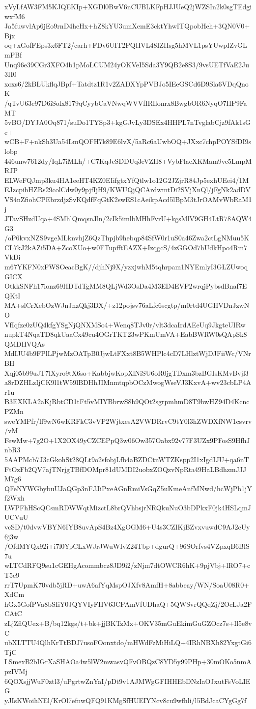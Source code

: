 xVyLfAW3FM5KJQEKIp+XGDl0BwV6nCUBLKFpHJJUeQ2jWZSIn2k0sgTEdgiwxfM6
Ja5fuwvlAp6jEo9rnD4heHx+hZ8kYU3umXemE3cktYhwITQpobHeh+3QN0V0+Bjx
oq+xGofFEps3x6FT2/carh+FDv6UIT2PQHVL48IZHsg5hMVL1psYUwpIZvGLmPBf
Unq96e39CGr3XFO4b1pMoLCUM24yOKVeI5Sda3Y9QB2e8S3/9vsUETfVaE2Ju3H0
xoxs6/2kBLUkflqJBpf+Tatdtz1R1v2ZADXYpPVBJo5IEeGSCd6D9Sla6VDqQnoK
/qTvU63c97D6iSolx8179qCyybCaVNwqWVVfIRIlonrx8BwgbOR6NyqO7HP9FaMT
5vBO/DYJA0Oq871/suDo1TYSp3+kgGJvLy3DSEx4HHPL7nTvglabCjz9fAk1sGc+
wCB+F+nkSh3Ua54LmQOFH7k89E6lvX/5aRc6aUwbOQ+JXxc7chpPOYSfDI9slobp
446unw7612dy/IqL7iMLh/+C7KqJcSDDUq3eVZH8+VybFlaeXKMam9vc5LmpMRJP
ELWeFQJmp3ku4HA1eeHT4KZ0EIifgtxYfQtlw1o12G2JZjrR84Jp5exhUEei4/1M
EJzcpibHZRs29colCdw0y9pjfIjH9/KWUQjQCArdwmtDi2SVjXnQl/jFgNk2adDV
VS4nZfiohCPEbrzdjzSvKQdfFqGtK2swES1cAeikpAcd5lBpM3tJrOAMvWbRaM1j
JTavSHzdUqa+4SMhlQmqsnJln/2cIk5imlbMHhFvrU+kgsMlV9GH4LtR78AQW4G3
/oP6kvxNZS9vgeMLknvhjZ6QzThpjb9hebqp84SfW0r1uS0a46Zwa2ctLgNMuu5K
CL7kJ2kAZi5DA+ZcoXUo+w0FTupfftEAZX+IzqgcS/4zGGOd7hUdkHpo4Rm7VkDi
m67YKFN0xFWSOeacBgK//djhNj9X/yzxjwhM5tqhrpam1NYEmlyI3GLZUwoqGICX
OtkkSNFh17ionz69HDTdTgMM8QLjWd3OsDa4M3ED4EVP2wrqjPybsdBnaf7EQKtI
MA+slCrXebOzWJnJnzQkj3DX/+z12pojsv76aLfc6scgtp/m0rtd4UGHVDnJzwNO
VfIqfze0zUQ4kfgYSgNjQNXMSo4+Wenq8TJv0r/vlt3dcaIrdAEeUq9JkgteUIRw
nupkT4NqaTD8qkUaaCx49cu4OGrTKT23wPKmUmVA+EabBWRW0sQApSk8QMDHVQAs
MdIJU4b9FPlLPjwMzOATpB0JjwLtFXxt8B5WHPlc4cD7LHlztWjDJFiiWc/VNrBH
Xqj05b99uJT7lXyro9tX6so+KabbjwKopXlNiSU6oR0jgTDxm3bzBGIsKMvBvjl3
a8rDZHLzIjCK9l1tW59lBDHhJIMnmtqpbOCzMwogWseVJ3KxvA+wv23cbLP4Ar1u
B3EXKLA2aKjRbtCD1tFt5vMIYBbrwS8b9QOt2sgrpmhmD8T9bwHZ94D4KcncPZMn
sweYMPfr/lf9wN6wKRFkC3vVP2WjtxesA2VWDRrvC9tY0l3hZWDXfNW1csvrv/vM
FewMw+7g2O+1X2OX49yCZCEPpQ3w06Ow357Oabx92v77F3UZx9PFosS9HfhJnbR3
5AAPMcb7J3cGkohSt28QLt9o2sfobjLfb4aBZDCtnWTZKspp2I1xIgdIJU+qa6nT
FtOzFb2QV7ajTNrjgTBfDOMpr81dUMDI2uobxZOQzvNpRta49HaLBdhzmJJJM7g6
QFeNYWGbybuUJaQGp3nFJJiPxeAGnRmiVsGqZ5uKmeAnfMNwd/hcWjPb1jYf2Wxh
LWPFhHScQCsmRDWWqtMizctL8brQVhbsjrNRQkuNuO3bDPkxF0jk4HSLqmJUCVuU
vcSD/t0dvwVBYN6IYB8uvApS4Bz4XgOGM6+U4s3CZIKjBZvxvuwdC9AJ2cUy6j3w
/OfdMYQx92i+i7l0YpCLxWJrJWuWIvZ24Tbp+dgurQ+96SOrfvs4VZpxqB6BlS7u
wLTCdRFQ9su1cGEHgAcommbcz8JD9i2/zNjm7dtOWCR6hK+9pjVbj+lRO7+cT5e9
rrT7UpmK70vdb5jRD+uwA6afYqMspOJXfv8AmfH+8abbeay/WN/SoaU08R0+XdCm
hGx5GofPVa8bSIiY0JQYVIyFHV63CPAmVfUDhaQ+5QWSvrQQqZj/2OcLJa2FCAtC
zLjZflQUex+B/bq12kgs/t+bk+jjBKTzMx+OKV35mGuEkimGuGZOcz7s+Il5e8vC
ubXLTTU4QlhKrTtBDJ7usoFOonxtdo/mHWdFzMiHiLQ+4IRhNBXh82YxgtGi6TjC
LSmexB2bIGrXaSHAOa4w5lW2mwasvQFvOBQzC8YD5y99PHp+30mOKo5nmApzIVMj
6QOXsjjWuF0ztl3/uPgrtwZnYaI/pDt9v1AJMWgGFIHHEbDNzIaOJxutFsVoLIEG
yJIsKWoihNEl/KrOl7efnwQFQ91KMgSfHUEIYNcv8cu9wfhli/l5BdJcaCYgGg7f
